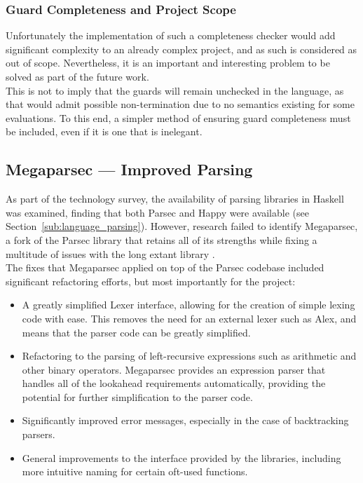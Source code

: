 
\subsubsection{Guard Completeness and Project Scope} %
\label{ssub:guard_completeness_and_project_scope}
Unfortunately the implementation of such a completeness checker would add significant complexity to an already complex project, and as such is considered as out of scope.
Nevertheless, it is an important and interesting problem to be solved as part of the future work.\\

This is not to imply that the guards will remain unchecked in the language, as that would admit possible non-termination due to no semantics existing for some evaluations.
To this end, a simpler method of ensuring guard completeness must be included, even if it is one that is inelegant. 



\subsection{Megaparsec --- Improved Parsing} %
\label{sub:megaparsec_improved_parsing}
As part of the technology survey, the availability of parsing libraries in Haskell was examined, finding that both Parsec and Happy were available (see Section~\ref{sub:language_parsing}). 
However, research failed to identify Megaparsec, a fork of the Parsec library that retains all of its strengths while fixing a multitude of issues with the long extant library \citep{megaparsec}.\\

The fixes that Megaparsec applied on top of the Parsec codebase included significant refactoring efforts, but most importantly for the project:
\begin{itemize}
    \item A greatly simplified Lexer interface, allowing for the creation of simple lexing code with ease.
    This removes the need for an external lexer such as Alex, and means that the parser code can be greatly simplified.
    \item Refactoring to the parsing of left-recursive expressions such as arithmetic and other binary operators. 
    Megaparsec provides an expression parser that handles all of the lookahead requirements automatically, providing the potential for further simplification to the parser code. 
    \item Significantly improved error messages, especially in the case of backtracking parsers. 
    \item General improvements to the interface provided by the libraries, including more intuitive naming for certain oft-used functions.
\end{itemize}

